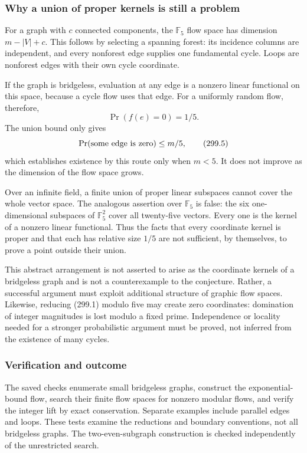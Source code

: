 \documentclass[11pt]{article}
\begin{document}
\subsubsection{Why a union of proper kernels is still a problem}
For a graph with $c$ connected components, the $\mathbb F_5$ flow space has dimension $m-|V|+c$. This follows by selecting a spanning forest: its incidence columns are independent, and every nonforest edge supplies one fundamental cycle. Loops are nonforest edges with their own cycle coordinate.

If the graph is bridgeless, evaluation at any edge is a nonzero linear functional on this space, because a cycle flow uses that edge. For a uniformly random flow, therefore,
\[
 \Pr(f(e)=0)=1/5.
\]
The union bound only gives
\[
 \Pr(\hbox{some edge is zero})\le m/5,
 \tag{299.5}
\]
which establishes existence by this route only when $m<5$. It does not improve as the dimension of the flow space grows.

Over an infinite field, a finite union of proper linear subspaces cannot cover the whole vector space. The analogous assertion over $\mathbb F_5$ is false: the six one-dimensional subspaces of $\mathbb F_5^2$ cover all twenty-five vectors. Every one is the kernel of a nonzero linear functional. Thus the facts that every coordinate kernel is proper and that each has relative size $1/5$ are not sufficient, by themselves, to prove a point outside their union.

This abstract arrangement is not asserted to arise as the coordinate kernels of a bridgeless graph and is not a counterexample to the conjecture. Rather, a successful argument must exploit additional structure of graphic flow spaces. Likewise, reducing (299.1) modulo five may create zero coordinates: domination of integer magnitudes is lost modulo a fixed prime. Independence or locality needed for a stronger probabilistic argument must be proved, not inferred from the existence of many cycles.

\subsubsection{Verification and outcome}
The saved checks enumerate small bridgeless graphs, construct the exponential-bound flow, search their finite flow spaces for nonzero modular flows, and verify the integer lift by exact conservation. Separate examples include parallel edges and loops. These tests examine the reductions and boundary conventions, not all bridgeless graphs. The two-even-subgraph construction is checked independently of the unrestricted search.
\end{document}

